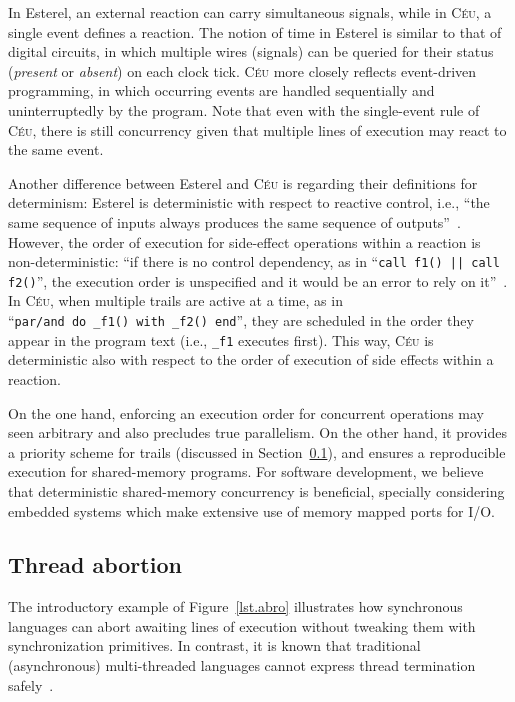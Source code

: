 \documentclass{acm_proc_article-sp}
\newcommand{\CEU}{\textsc{C\'{e}u}\xspace}
\newcommand{\code}[1] {{\small{\texttt{#1}}}}
\newcommand{\1}{\;}
\newcommand{\2}{\;\;}
\newcommand{\3}{\;\;\;}
\newcommand{\5}{\;\;\;\;\;}
\begin{document}
In Esterel, an external reaction can carry simultaneous signals, while in \CEU, 
a single event defines a reaction.
%
The notion of time in Esterel is similar to that of digital circuits, in which 
multiple wires (signals) can be queried for their status (\emph{present} or 
\emph{absent}) on each clock tick.
%
\CEU more closely reflects event-driven programming, in which occurring events 
are handled sequentially and uninterruptedly by the program.
%
Note that even with the single-event rule of \CEU, there is still concurrency 
given that multiple lines of execution may react to the same event.

Another difference between Esterel and \CEU is regarding their definitions for 
determinism:
%
Esterel is deterministic with respect to reactive control, i.e., ``the same 
sequence of inputs always produces the same sequence of 
outputs''~\cite{esterel.primer}.
However, the order of execution for side-effect operations within a reaction is 
non-deterministic: ``if there is no control dependency, as in ``\code{call f1() 
|| call f2()}'', the execution order is unspecified and it would be an error to 
rely on it''~\cite{esterel.primer}.
%
In \CEU, when multiple trails are active at a time, as in
``\code{par/and~do~\_f1()~with~\_f2()~end}'', they are scheduled in the order 
they appear in the program text (i.e., \code{\_f1} executes first).
%
This way, \CEU is deterministic also with respect to the order of execution of 
side effects within a reaction.

On the one hand, enforcing an execution order for concurrent operations may 
seen arbitrary and also precludes true parallelism.
On the other hand, it provides a priority scheme for trails (discussed in 
Section~\ref{sec.ceu.abrt}), and ensures a reproducible execution for 
shared-memory programs.
%
For software development, we believe that deterministic shared-memory 
concurrency is beneficial, specially considering embedded systems which make 
extensive use of memory mapped ports for I/O.

\subsection{Thread abortion}
\label{sec.ceu.abrt}

The introductory example of Figure~\ref{lst.abro} illustrates how synchronous 
languages can abort awaiting lines of execution without tweaking them with 
synchronization primitives.
In contrast, it is known that traditional (asynchronous) multi-threaded 
languages cannot express thread termination safely~\cite{esterel.preemption}.
\end{document}
